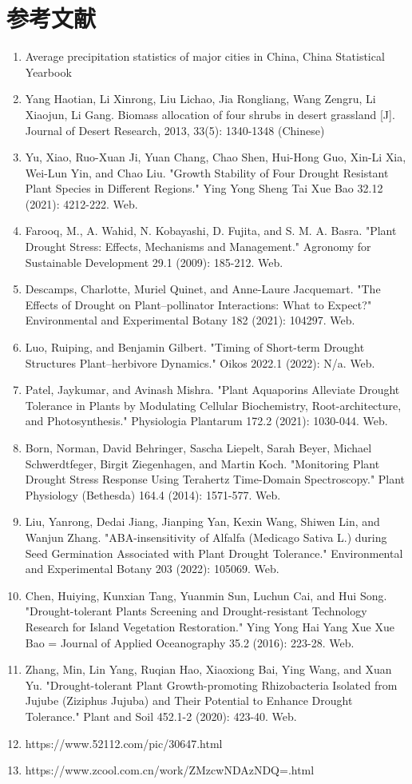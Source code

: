 \documentclass[11pt,a4paper]{ctexart}
\begin{document}
\section*{参考文献}
\begin{enumerate}
\item Average precipitation statistics of major cities in China, China Statistical Yearbook
\item Yang Haotian, Li Xinrong, Liu Lichao, Jia Rongliang, Wang Zengru, Li Xiaojun, Li Gang. Biomass allocation of four shrubs in desert grassland [J]. Journal of Desert Research, 2013, 33(5): 1340-1348 (Chinese)
\item Yu, Xiao, Ruo-Xuan Ji, Yuan Chang, Chao Shen, Hui-Hong Guo, Xin-Li Xia, Wei-Lun Yin, and Chao Liu. "Growth Stability of Four Drought Resistant Plant Species in Different Regions." Ying Yong Sheng Tai Xue Bao 32.12 (2021): 4212-222. Web.
\item Farooq, M., A. Wahid, N. Kobayashi, D. Fujita, and S. M. A. Basra. "Plant Drought Stress: Effects, Mechanisms and Management." Agronomy for Sustainable Development 29.1 (2009): 185-212. Web.
\item Descamps, Charlotte, Muriel Quinet, and Anne-Laure Jacquemart. "The Effects of Drought on Plant--pollinator Interactions: What to Expect?" Environmental and Experimental Botany 182 (2021): 104297. Web.
\item Luo, Ruiping, and Benjamin Gilbert. "Timing of Short-term Drought Structures Plant--herbivore Dynamics." Oikos 2022.1 (2022): N/a. Web.
\item Patel, Jaykumar, and Avinash Mishra. "Plant Aquaporins Alleviate Drought Tolerance in Plants by Modulating Cellular Biochemistry, Root-architecture, and Photosynthesis." Physiologia Plantarum 172.2 (2021): 1030-044. Web.
\item Born, Norman, David Behringer, Sascha Liepelt, Sarah Beyer, Michael Schwerdtfeger, Birgit Ziegenhagen, and Martin Koch. "Monitoring Plant Drought Stress Response Using Terahertz Time-Domain Spectroscopy." Plant Physiology (Bethesda) 164.4 (2014): 1571-577. Web.
\item Liu, Yanrong, Dedai Jiang, Jianping Yan, Kexin Wang, Shiwen Lin, and Wanjun Zhang. "ABA-insensitivity of Alfalfa (Medicago Sativa L.) during Seed Germination Associated with Plant Drought Tolerance." Environmental and Experimental Botany 203 (2022): 105069. Web.
\item Chen, Huiying, Kunxian Tang, Yuanmin Sun, Luchun Cai, and Hui Song. "Drought-tolerant Plants Screening and Drought-resistant Technology Research for Island Vegetation Restoration." Ying Yong Hai Yang Xue Xue Bao = Journal of Applied Oceanography 35.2 (2016): 223-28. Web.
\item Zhang, Min, Lin Yang, Ruqian Hao, Xiaoxiong Bai, Ying Wang, and Xuan Yu. "Drought-tolerant Plant Growth-promoting Rhizobacteria Isolated from Jujube (Ziziphus Jujuba) and Their Potential to Enhance Drought Tolerance." Plant and Soil 452.1-2 (2020): 423-40. Web.
\item https://www.52112.com/pic/30647.html
\item https://www.zcool.com.cn/work/ZMzcwNDAzNDQ=.html
\end{enumerate}
\end{document}
